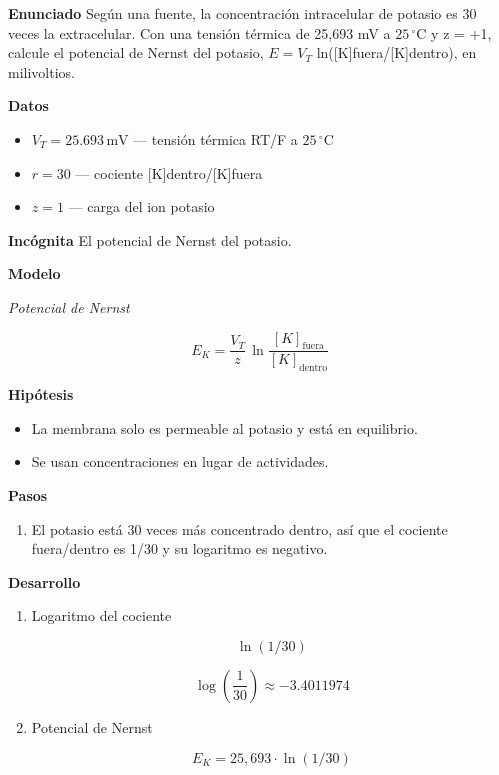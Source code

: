 \documentclass{book}
\begin{document}
\begin{tcolorbox}[title={Problema resuelto}, studiumworked, breakable]

\noindent\textbf{Enunciado}
Según una fuente, la concentración intracelular de potasio es 30 veces la extracelular. Con una tensión térmica de 25,693 mV a \(25\,{}^{\circ}\mathrm{C}\) y z = +1, calcule el potencial de Nernst del potasio, \(E = V_T\) ln([K]fuera/[K]dentro), en milivoltios.


\noindent\textbf{Datos}
\begin{itemize}
\item $V_{T} = 25.693\,\mathrm{mV}$ — tensión térmica RT/F a \(25\,{}^{\circ}\mathrm{C}\)
\item $r = 30$ — cociente [K]dentro/[K]fuera
\item $z = 1$ — carga del ion potasio
\end{itemize}

\noindent\textbf{Incógnita}
El potencial de Nernst del potasio.


\noindent\textbf{Modelo}

\noindent\textit{Potencial de Nernst}

\[
E_{K} = \frac{V_T}{z}\,\ln\frac{[K]_{\mathrm{fuera}}}{[K]_{\mathrm{dentro}}}
\]

\noindent\textbf{Hipótesis}
\begin{itemize}
\item La membrana solo es permeable al potasio y está en equilibrio.
\item Se usan concentraciones en lugar de actividades.
\end{itemize}

\noindent\textbf{Pasos}
\begin{enumerate}
\item
El potasio está 30 veces más concentrado dentro, así que el cociente fuera/dentro es 1/30 y su logaritmo es negativo.

\end{enumerate}

\noindent\textbf{Desarrollo}
\begin{enumerate}
\item
Logaritmo del cociente


\[
\ln(1/30)
\]

\[
\operatorname{log}\left(\frac{1}{30}\right) \approx -3.4011974
\]
\item
Potencial de Nernst


\[
E_K = 25{,}693 \cdot \ln(1/30)
\]


\end{enumerate}
\end{tcolorbox}
\end{document}
